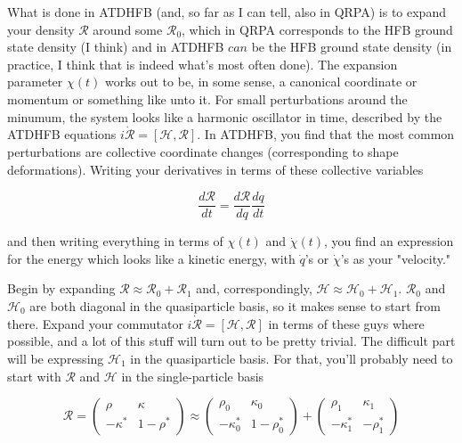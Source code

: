 What is done in ATDHFB (and, so far as I can tell, also in QRPA) is to expand your density $\mathcal{R}$ around some $\mathcal{R}_0$, which in QRPA corresponds to the HFB ground state density (I think) and in ATDHFB $\mathit{can}$ be the HFB ground state density (in practice, I think that is indeed what's most often done). The expansion parameter $\chi(t)$ works out to be, in some sense, a canonical coordinate or momentum or something like unto it. For small perturbations around the minumum, the system looks like a harmonic oscillator in time, described by the ATDHFB equations $i\dot{\mathcal{R}} = \left[\mathcal{H, R}\right]$. In ATDHFB, you find that the most common perturbations are collective coordinate changes (corresponding to shape deformations). Writing your derivatives in terms of these collective variables

\begin{equation}
\frac{d\mathcal{R}}{dt} = \frac{d\mathcal{R}}{dq}\frac{dq}{dt}
\end{equation}

\noindent and then writing everything in terms of $\chi(t)$ and $\dot{\chi}(t)$, you find an expression for the energy which looks like a kinetic energy, with $\dot{q}$'s or $\dot{\chi}$'s as your "velocity."

Begin by expanding $\mathcal{R}\approx\mathcal{R}_0+\mathcal{R}_1$ and, correspondingly, $\mathcal{H}\approx\mathcal{H}_0+\mathcal{H}_1$. $\mathcal{R}_0$ and $\mathcal{H}_0$ are both diagonal in the quasiparticle basis, so it makes sense to start from there. Expand your commutator $i\dot{\mathcal{R}} = \left[\mathcal{H, R}\right]$ in terms of these guys where possible, and a lot of this stuff will turn out to be pretty trivial. The difficult part will be expressing $\mathcal{H}_1$ in the quasiparticle basis. For that, you'll probably need to start with $\mathcal{R}$ and $\mathcal{H}$ in the single-particle basis

\begin{equation}
\mathcal{R} = \left(\begin{array}{cc}
\rho & \kappa \\ 
-\kappa^* & 1-\rho^*
\end{array} \right)
\approx
\left(\begin{array}{cc}
\rho_0 & \kappa_0 \\ 
-\kappa^*_0 & 1-\rho^*_0
\end{array} \right) + 
\left(\begin{array}{cc}
\rho_1 & \kappa_1 \\ 
-\kappa^*_1 & -\rho^*_1
\end{array} \right)
\end{equation}

